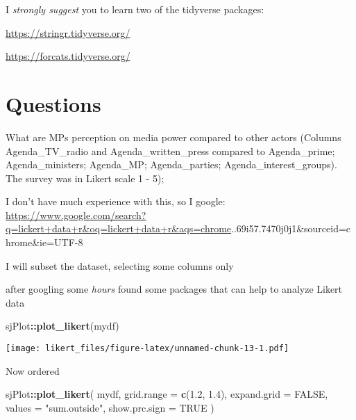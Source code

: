 \documentclass[
]{article}
\newenvironment{Shaded}{\begin{snugshade}}{\end{snugshade}}
\newcommand{\DataTypeTok}[1]{\textcolor[rgb]{0.13,0.29,0.53}{#1}}
\newcommand{\FloatTok}[1]{\textcolor[rgb]{0.00,0.00,0.81}{#1}}
\newcommand{\KeywordTok}[1]{\textcolor[rgb]{0.13,0.29,0.53}{\textbf{#1}}}
\newcommand{\NormalTok}[1]{#1}
\newcommand{\OperatorTok}[1]{\textcolor[rgb]{0.81,0.36,0.00}{\textbf{#1}}}
\newcommand{\OtherTok}[1]{\textcolor[rgb]{0.56,0.35,0.01}{#1}}
\newcommand{\StringTok}[1]{\textcolor[rgb]{0.31,0.60,0.02}{#1}}
\begin{document}
I \emph{strongly suggest} you to learn two of the tidyverse packages:

\url{https://stringr.tidyverse.org/}

\url{https://forcats.tidyverse.org/}

\hypertarget{questions}{%
\section{Questions}\label{questions}}

What are MPs perception on media power compared to other actors (Columns
Agenda\_TV\_radio and Agenda\_written\_press compared to Agenda\_prime;
Agenda\_ministers; Agenda\_MP; Agenda\_parties;
Agenda\_interest\_groups). The survey was in Likert scale 1 - 5);

I don't have much experience with this, so I google:
\url{https://www.google.com/search?q=lickert+data+r\&oq=lickert+data+r\&aqs=chrome}..69i57.7470j0j1\&sourceid=chrome\&ie=UTF-8

I will subset the dataset, selecting some columns only

\begin{Shaded}
\end{Shaded}

after googling some \emph{hours} found some packages that can help to
analyze Likert data

\begin{Shaded}
\begin{Highlighting}[]
\NormalTok{sjPlot}\OperatorTok{::}\KeywordTok{plot_likert}\NormalTok{(mydf)}
\end{Highlighting}
\end{Shaded}

\texttt{[image: likert\_files/figure-latex/unnamed-chunk-13-1.pdf]}

Now ordered

\begin{Shaded}
\begin{Highlighting}[]
\NormalTok{sjPlot}\OperatorTok{::}\KeywordTok{plot_likert}\NormalTok{(}
\NormalTok{  mydf,}
  \DataTypeTok{grid.range =} \KeywordTok{c}\NormalTok{(}\FloatTok{1.2}\NormalTok{, }\FloatTok{1.4}\NormalTok{),}
  \DataTypeTok{expand.grid =} \OtherTok{FALSE}\NormalTok{,}
  \DataTypeTok{values =} \StringTok{"sum.outside"}\NormalTok{,}
  \DataTypeTok{show.prc.sign =} \OtherTok{TRUE}
\NormalTok{)}
\end{Highlighting}
\end{Shaded}
\end{document}
